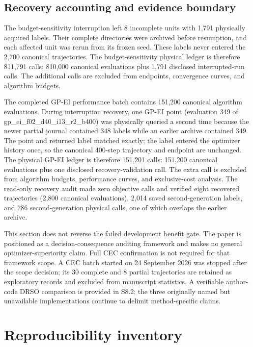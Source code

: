 \documentclass[cmc,article,submit,moreauthors,pdftex]{Definitions/tsp}
\begin{document}
\hypertarget{recovery-accounting-and-evidence-boundary}{%
\subsection{Recovery accounting and evidence boundary}\label{recovery-accounting-and-evidence-boundary}}

The budget-sensitivity interruption left 8 incomplete units with 1,791 physically acquired labels. Their complete directories were archived before resumption, and each affected unit was rerun from its frozen seed. These labels never entered the 2,700 canonical trajectories. The budget-sensitivity physical ledger is therefore 811,791 calls: 810,000 canonical evaluations plus 1,791 disclosed interrupted-run calls. The additional calls are excluded from endpoints, convergence curves, and algorithm budgets.

The completed GP-EI performance batch contains 151,200 canonical algorithm evaluations. During interruption recovery, one GP-EI point (evaluation 349 of gp\_ei\_f02\_d40\_i13\_r2\_b400) was physically queried a second time because the newer partial journal contained 348 labels while an earlier archive contained 349. The point and returned label matched exactly; the label entered the optimizer history once, so the canonical 400-step trajectory and endpoint are unchanged. The physical GP-EI ledger is therefore 151,201 calls: 151,200 canonical evaluations plus one disclosed recovery-validation call. The extra call is excluded from algorithm budgets, performance curves, and exclusive-cost analysis. The read-only recovery audit made zero objective calls and verified eight recovered trajectories (2,800 canonical evaluations), 2,014 saved second-generation labels, and 786 second-generation physical calls, one of which overlaps the earlier archive.

This section does not reverse the failed development benefit gate. The paper is positioned as a decision-consequence auditing framework and makes no general optimizer-superiority claim. Full CEC confirmation is not required for that framework scope. A CEC batch started on 24 September 2026 was stopped after the scope decision; its 30 complete and 8 partial trajectories are retained as exploratory records and excluded from manuscript statistics. A verifiable author-code DRSO comparison is provided in S8.2; the three originally named but unavailable implementations continue to delimit method-specific claims.

\hypertarget{reproducibility-inventory}{%
\section{Reproducibility inventory}\label{reproducibility-inventory}}
\end{document}
